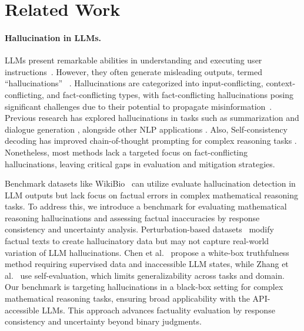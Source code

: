 \section{Related Work}
\paragraph{Hallucination in LLMs.}

LLMs present remarkable abilities in understanding and executing user instructions~\cite{DBLP:conf/emnlp/Peng0S24}. However, they often generate misleading outputs, termed \textrm{``hallucinations''}
~\cite{DBLP:conf/www/ShenLFRBN23}. Hallucinations are categorized into input-conflicting, context-conflicting, and fact-conflicting types, with fact-conflicting hallucinations posing significant challenges due to their potential to propagate misinformation~\cite{DBLP:conf/ijcai/0016SGW000LZC24}. Previous research has explored hallucinations in tasks such as summarization \cite{DBLP:conf/naacl/PagnoniBT21} and dialogue generation \cite{DBLP:conf/emnlp/DasSS22}, alongside other NLP applications \cite{DBLP:conf/acl/MallenAZDKH23}. Also, Self-consistency decoding has improved chain-of-thought prompting for complex reasoning tasks \cite{rabby2024mc}. Nonetheless, most methods lack a targeted focus on fact-conflicting hallucinations, leaving critical gaps in evaluation and mitigation strategies.

Benchmark datasets like WikiBio~\cite{DBLP:conf/acl/StranisciDMPRC23} can utilize evaluate hallucination detection in LLM outputs but lack focus on factual errors in complex mathematical reasoning tasks. To address this, we introduce a benchmark for evaluating mathematical reasoning hallucinations and assessing factual inaccuracies by response consistency and uncertainty analysis. Perturbation-based datasets~\cite{DBLP:conf/naacl/ThorneVCM18}  modify factual texts to create hallucinatory data but may not capture real-world variation of LLM hallucinations. Chen et al.~\cite{DBLP:conf/ijcai/0016SGW000LZC24} propose a white-box truthfulness method requiring supervised data and inaccessible LLM states, while Zhang et al.~\cite{DBLP:conf/acl/ZhangPTZJSMM24} use self-evaluation, which limits generalizability across tasks and domain. Our benchmark is targeting hallucinations in a black-box setting for complex mathematical reasoning tasks, ensuring broad applicability with the API-accessible LLMs. This approach advances factuality evaluation by response consistency and uncertainty beyond binary judgments.



